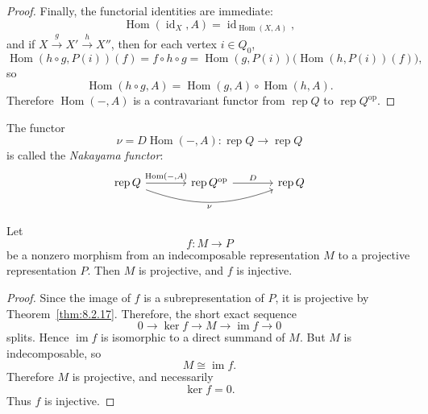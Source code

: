 \documentclass[11pt, a4paper]{report}
\begin{document}
\begin{proof}
            Finally, the functorial identities are immediate:
            \[
            \operatorname{Hom}(\operatorname{id}_X,A)=\operatorname{id}_{\operatorname{Hom}(X,A)},
            \]
            and if \(X\xrightarrow{g} X'\xrightarrow{h} X''\), then for each vertex \(i\in Q_0\),
            \[
            \operatorname{Hom}(h\circ g,P(i))(f)
            =
            f\circ h\circ g
            =
            \operatorname{Hom}(g,P(i))\bigl(\operatorname{Hom}(h,P(i))(f)\bigr),
            \]
            so
            \[
            \operatorname{Hom}(h\circ g,A)
            =
            \operatorname{Hom}(g,A)\circ \operatorname{Hom}(h,A).
            \]
            Therefore \(\operatorname{Hom}(-,A)\) is a contravariant functor from
            \(\operatorname{rep}Q\) to \(\operatorname{rep}Q^{\operatorname{op}}\).
            \end{proof}

            \begin{definition}
                The functor
                \[
                \nu = D\operatorname{Hom}(-,A): \operatorname{rep}Q \to \operatorname{rep}Q
                \]
                is called the \emph{Nakayama functor}:
                \[
                \begin{tikzcd}[column sep=large]
                \operatorname{rep}Q
                \arrow[r, "{\operatorname{Hom}(-,A)}"]
                \arrow[rr, bend right=20, "\nu"']
                & \operatorname{rep}Q^{\operatorname{op}}
                \arrow[r, "D"]
                & \operatorname{rep}Q
                \end{tikzcd}
                \]
                \end{definition}

                \begin{lemma}\label{lem:9.0.9}
                    Let
                    \[
                    f\colon M \to P
                    \]
                    be a nonzero morphism from an indecomposable representation \(M\) to a projective representation \(P\). Then \(M\) is projective, and \(f\) is injective.
                    \end{lemma}

                    \begin{proof}
                    Since the image of \(f\) is a subrepresentation of \(P\), it is projective by Theorem~\ref{thm:8.2.17}. Therefore, the short exact sequence
                    \[
                    0 \longrightarrow \ker f \longrightarrow M \longrightarrow \operatorname{im} f \longrightarrow 0
                    \]
                    splits. Hence \(\operatorname{im} f\) is isomorphic to a direct summand of \(M\). But \(M\) is indecomposable, so
                    \[
                    M \cong \operatorname{im} f.
                    \]
                    Therefore \(M\) is projective, and necessarily
                    \[
                    \ker f = 0.
                    \]
                    Thus \(f\) is injective.
                    \end{proof}
\end{document}

